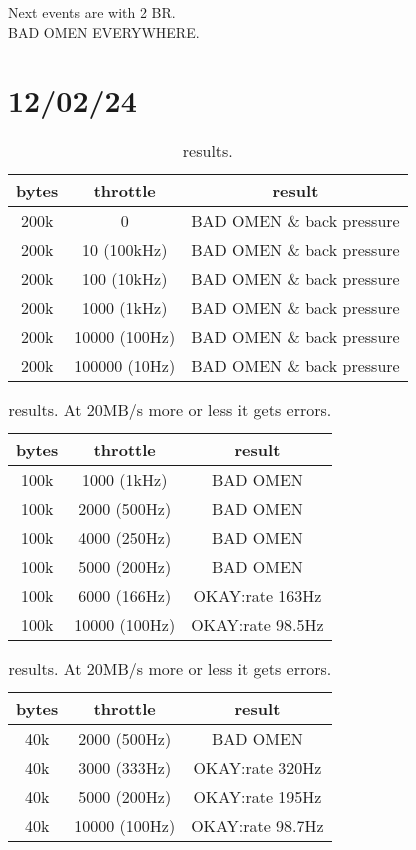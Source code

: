 \documentclass{article}
\begin{document}
Next events are with 2 BR.
\\
BAD OMEN EVERYWHERE.
\section{12/02/24}
\begin{center}  
\begin{table}[!h]
\centering
\begin{tabular}{c c c}
\hline
bytes & throttle &  result\\
\hline
200k & 0 & BAD OMEN \& back pressure \\
200k & 10 (100kHz) & BAD OMEN \& back pressure \\
200k & 100 (10kHz) & BAD OMEN \& back pressure\\
200k & 1000 (1kHz) & BAD OMEN \& back pressure \\
200k & 10000 (100Hz) & BAD OMEN \& back pressure \\
200k & 100000 (10Hz) & BAD OMEN \& back pressure\\
\end{tabular}
\caption{ results.}
\end{table}\label{tab:upperlimits}
\end{center}
\begin{center}  
\begin{table}[!h]
\centering
\begin{tabular}{c c c}
\hline
bytes & throttle &  result\\
\hline
100k & 1000 (1kHz) & BAD OMEN \\
100k & 2000 (500Hz) & BAD OMEN \\
100k & 4000 (250Hz) & BAD OMEN \\
100k & 5000 (200Hz) & BAD OMEN \\
100k & 6000 (166Hz) & OKAY:rate 163Hz \\
100k & 10000 (100Hz) & OKAY:rate 98.5Hz \\
\end{tabular}
\caption{ results. At 20MB/s more or less it gets errors.}
\end{table}\label{tab:upperlimits}
\end{center}
\begin{center}  
\begin{table}[!h]
\centering
\begin{tabular}{c c c}
\hline
bytes & throttle &  result\\
\hline
40k & 2000 (500Hz) & BAD OMEN  \\
40k & 3000 (333Hz) & OKAY:rate 320Hz  \\
40k & 5000 (200Hz) & OKAY:rate 195Hz  \\
40k & 10000 (100Hz) & OKAY:rate 98.7Hz \\
\end{tabular}
\caption{ results. At 20MB/s more or less it gets errors.}
\end{table}\label{tab:upperlimits}
\end{center}
\end{document}
